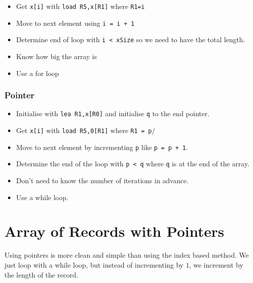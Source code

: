 \begin{itemize}
    \item Get \texttt{x[i]} with \texttt{load R5,x[R1]} where \texttt{R1=i}
    \item Move to next element using \texttt{i = i + 1}
    \item Determine end of loop with \texttt{i < xSize} so we need to have the total length.
    \item Know how big the array is
    \item Use a for loop
\end{itemize}

\subsubsection{Pointer}\label{ssub:pointer}

\begin{itemize}
    \item Initialise with \texttt{lea R1,x[R0]} and initialise \texttt{q} to the end pointer.
    \item Get \texttt{x[i]} with \texttt{load R5,0[R1]} where \texttt{R1 = p}/
    \item Move to next element by incrementing \texttt{p} like \texttt{p = p + 1}.
    \item Determine the end of the loop with \texttt{p < q} where \texttt{q} is at the end of the array.
    \item Don't need to know the number of iterations in advance.
    \item Use a while loop.
\end{itemize}

\section{Array of Records with Pointers}\label{sec:array_of_records_with_pointers}

Using pointers is more clean and simple than using the index based method.
We just loop with a while loop, but instead of incrementing by \(1\), we increment by the length of the record.

